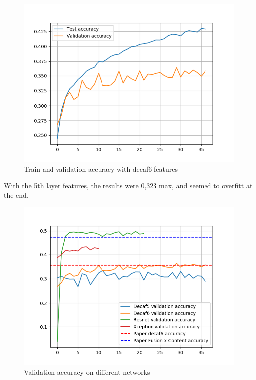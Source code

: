 	\begin{figure}[ht]
		\includegraphics[scale = 0.8]{images/results_decaf6.png}
		\caption{Train and validation accuracy with decaf6 features}
	\end{figure}
	
	With the 5th layer features, the results were 0,323 max, and seemed to overfitt at the end.\\

\begin{figure}[ht]
	\includegraphics[scale = 0.8]{images/general_results.png}
	\caption{Validation accuracy on different networks}
\end{figure}


